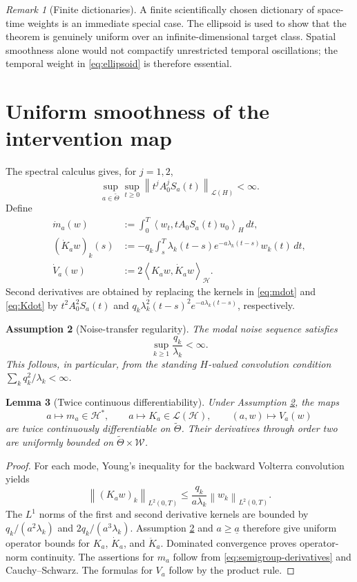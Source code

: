 \documentclass[11pt]{article}
\newtheorem{assumption}{Assumption}[section]
\newtheorem{lemma}[assumption]{Lemma}
\theoremstyle{remark}
\newtheorem{remark}[assumption]{Remark}
\newcommand{\cH}{\mathcal H}
\newcommand{\cW}{\mathcal W}
\newcommand{\norm}[1]{\left\lVert #1\right\rVert}
\newcommand{\ip}[2]{\left\langle #1,#2\right\rangle}
\begin{document}
\begin{remark}[Finite dictionaries]
A finite scientifically chosen dictionary of space-time weights is an immediate special case.  The ellipsoid is used to show that the theorem is genuinely uniform over an infinite-dimensional target class.  Spatial smoothness alone would not compactify unrestricted temporal oscillations; the temporal weight in \eqref{eq:ellipsoid} is therefore essential.
\end{remark}

\section{Uniform smoothness of the intervention map}

The spectral calculus gives, for $j=1,2$,
\begin{equation}\label{eq:semigroup-derivatives}
 \sup_{a\in\widetilde\Theta}\sup_{t\ge0}
 \norm{t^jA_0^jS_a(t)}_{\mathcal L(H)}<\infty.
\end{equation}
Define
\begin{align}
 \dot m_a(w)
 &:=\int_0^T\ip{w_t}{tA_0S_a(t)u_0}_H\,dt,\label{eq:mdot}\\
 (\dot K_aw)_k(s)
 &:=-q_k\int_s^T\lambda_k(t-s)e^{-a\lambda_k(t-s)}w_k(t)\,dt,\label{eq:Kdot}\\
 \dot V_a(w)
 &:=2\ip{K_aw}{\dot K_aw}_{\cH}.\label{eq:Vdot}
\end{align}
Second derivatives are obtained by replacing the kernels in \eqref{eq:mdot} and \eqref{eq:Kdot} by $t^2A_0^2S_a(t)$ and $q_k\lambda_k^2(t-s)^2e^{-a\lambda_k(t-s)}$, respectively.

\begin{assumption}[Noise-transfer regularity]\label{ass:K}
The modal noise sequence satisfies
\[
 \sup_{k\ge1}\frac{q_k}{\lambda_k}<\infty.
\]
This follows, in particular, from the standing $H$-valued convolution condition $\sum_kq_k^2/\lambda_k<\infty$.
\end{assumption}

\begin{lemma}[Twice continuous differentiability]\label{lem:C2}
Under Assumption \ref{ass:K}, the maps
\[
 a\mapsto m_a\in\cH^*,
 \qquad
 a\mapsto K_a\in\mathcal L(\cH),
 \qquad
 (a,w)\mapsto V_a(w)
\]
are twice continuously differentiable on $\widetilde\Theta$.  Their derivatives through order two are uniformly bounded on $\widetilde\Theta\times\cW$.
\end{lemma}

\begin{proof}
For each mode, Young's inequality for the backward Volterra convolution yields
\[
 \norm{(K_aw)_k}_{L^2(0,T)}
 \le \frac{q_k}{a\lambda_k}\norm{w_k}_{L^2(0,T)}.
\]
The $L^1$ norms of the first and second derivative kernels are bounded by $q_k/(a^2\lambda_k)$ and $2q_k/(a^3\lambda_k)$.  Assumption \ref{ass:K} and $a\ge\underline a$ therefore give uniform operator bounds for $K_a$, $\dot K_a$, and $\ddot K_a$.  Dominated convergence proves operator-norm continuity.  The assertions for $m_a$ follow from \eqref{eq:semigroup-derivatives} and Cauchy--Schwarz.  The formulas for $V_a$ follow by the product rule.
\end{proof}
\end{document}
